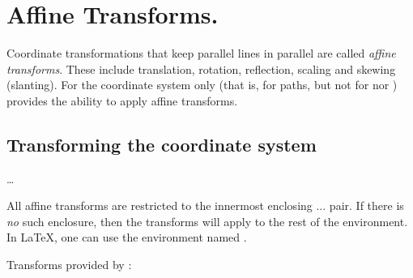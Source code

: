 \documentclass[letterpaper]{article}
\begin{document}
\section{Affine Transforms.}\label{transforms}

Coordinate transformations that keep parallel lines in parallel are
called \emph{affine transforms}.  These include translation, rotation,
reflection, scaling and skewing (slanting). For the \MF{} coordinate
system only (that is, for paths, but not for  nor
) \mfp{} provides the ability to apply \MF{} affine
transforms.


\subsection{Transforming the \MF{} coordinate system}\label{affine}

\begin{cd}
 \dots {}%
%
\end{cd}

All affine transforms are restricted to the innermost enclosing
$\ldots$ pair.  If there is \emph{no} such
enclosure, then the transforms will apply to the rest of the 
environment. In \LaTeX{}, one can use the environment named
.

\medskip
\noindent Transforms provided by \mfp{}:
\end{document}
